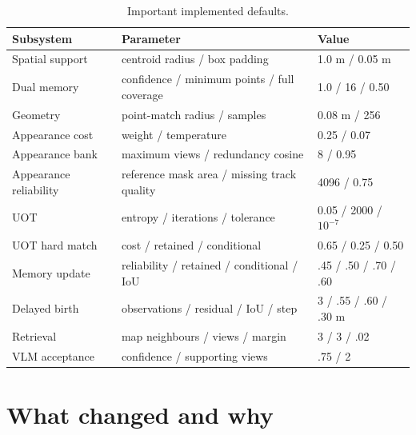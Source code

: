\documentclass[11pt]{article}
\newcommand{\1}{\bm{1}}
\begin{document}
\begin{table}[h]
\centering
\caption{Important implemented defaults.}
\begin{tabular}{lll}
\toprule
Subsystem & Parameter & Value\\
\midrule
Spatial support & centroid radius / box padding & 1.0 m / 0.05 m\\
Dual memory & confidence / minimum points / full coverage & 1.0 / 16 / 0.50\\
Geometry & point-match radius / samples & 0.08 m / 256\\
Appearance cost & weight / temperature & 0.25 / 0.07\\
Appearance bank & maximum views / redundancy cosine & 8 / 0.95\\
Appearance reliability & reference mask area / missing track quality & 4096 / 0.75\\
UOT & entropy / iterations / tolerance & 0.05 / 2000 / $10^{-7}$\\
UOT hard match & cost / retained / conditional & 0.65 / 0.25 / 0.50\\
Memory update & reliability / retained / conditional / IoU & .45 / .50 / .70 / .60\\
Delayed birth & observations / residual / IoU / step & 3 / .55 / .60 / .30 m\\
Retrieval & map neighbours / views / margin & 3 / 3 / .02\\
VLM acceptance & confidence / supporting views & .75 / 2\\
\bottomrule
\end{tabular}
\end{table}

\section{What changed and why}
\end{document}
